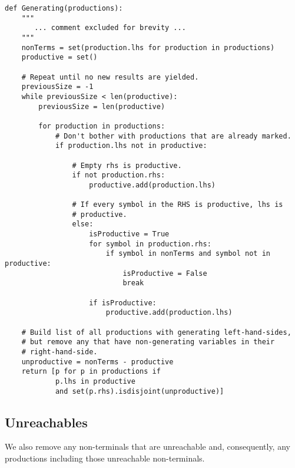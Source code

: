 \documentclass{article}
\begin{document}
\begin{verbatim}
def Generating(productions):
    """
       ... comment excluded for brevity ... 
    """
    nonTerms = set(production.lhs for production in productions)
    productive = set()

    # Repeat until no new results are yielded.
    previousSize = -1
    while previousSize < len(productive):
        previousSize = len(productive)

        for production in productions:
            # Don't bother with productions that are already marked.
            if production.lhs not in productive:

                # Empty rhs is productive.
                if not production.rhs:
                    productive.add(production.lhs)

                # If every symbol in the RHS is productive, lhs is
                # productive.
                else:
                    isProductive = True
                    for symbol in production.rhs:
                        if symbol in nonTerms and symbol not in productive:
                            isProductive = False
                            break

                    if isProductive:
                        productive.add(production.lhs)

    # Build list of all productions with generating left-hand-sides,
    # but remove any that have non-generating variables in their
    # right-hand-side.
    unproductive = nonTerms - productive
    return [p for p in productions if
            p.lhs in productive
            and set(p.rhs).isdisjoint(unproductive)]
\end{verbatim}
\label{exerpt:generating}

\subsection{Unreachables}
We also remove any non-terminals that are unreachable and, consequently,
any productions including those unreachable non-terminals.
\end{document}
